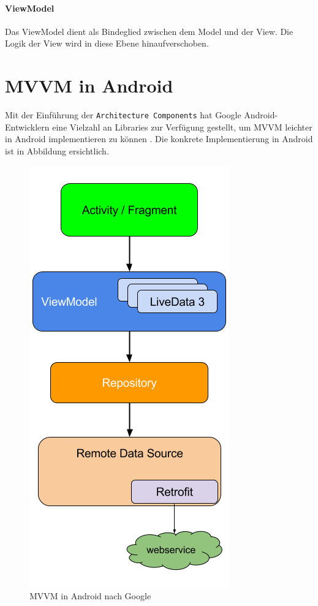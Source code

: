 \hypertarget{viewmodel}{%
\paragraph{ViewModel}\label{viewmodel}}

Das ViewModel dient als Bindeglied zwischen dem Model und der View. Die
Logik der View wird in diese Ebene hinaufverschoben.

\hypertarget{mvvm-in-android}{%
\section{MVVM in Android}\label{mvvm-in-android}}

Mit der Einführung der \texttt{Architecture\ Components} hat Google
Android-Entwicklern eine Vielzahl an Libraries zur Verfügung gestellt,
um MVVM leichter in Android implementieren zu können
\cite{mvvm-architecture-components}. Die konkrete Implementierung in
Android ist in Abbildung  ersichtlich.

\begin{figure}
\centering
\includegraphics{mvvm.png}
\caption{MVVM in Android nach Google \cite{mvvm} \cite{mvvm-bild}
\label{fig:mvvm}}
\end{figure}

